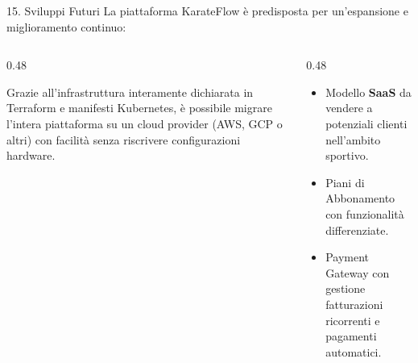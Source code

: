 \documentclass[aspectratio=169, 10pt]{beamer}
\begin{document}
\begin{frame}{15. Sviluppi Futuri}
 La piattaforma KarateFlow è predisposta per un'espansione e miglioramento continuo:
  \vspace{0.4cm}
  \begin{columns}
    \begin{column}{0.48\textwidth}
      \begin{tcolorbox}[colback=karateDark!5, colframe=karateDark, title=1. Migrazione Cloud Semplificata, height=4.5cm]
        Grazie all'infrastruttura interamente dichiarata in Terraform e manifesti Kubernetes, è possibile migrare l'intera piattaforma su un cloud provider (AWS, GCP o altri) con facilità senza riscrivere configurazioni hardware.
      \end{tcolorbox}
    \end{column}
    
         \begin{column}{0.48\textwidth}
          \begin{tcolorbox}[colback=karateDark!5, colframe=karateDark, title=2. Monetizzazione Futura (SaaS), height=4.5cm]
            \begin{itemize}
               \item Modello \textbf{SaaS} da vendere a potenziali clienti nell'ambito sportivo. 
               \item Piani di Abbonamento con funzionalità differenziate.
               \item Payment Gateway con gestione fatturazioni ricorrenti e pagamenti automatici.
            \end{itemize}
          \end{tcolorbox}
        \end{column}
    
  \end{columns}
\end{frame}
\end{document}
